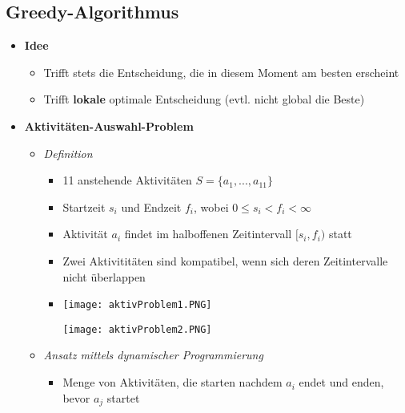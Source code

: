 \subsection{Greedy-Algorithmus}
    \begin{itemize}
        \item \textbf{Idee}
            \begin{itemize}
                \item Trifft stets die Entscheidung, die in diesem Moment am besten erscheint
                \item Trifft \textbf{lokale} optimale Entscheidung (evtl. nicht global die Beste)
            \end{itemize}
        
        \item \textbf{Aktivitäten-Auswahl-Problem}
            \begin{itemize}
                \item \textit{Definition}
                    \begin{itemize}
                        \item 11 anstehende Aktivitäten $S=\{a_1,...,a_{11}\}$
                        \item Startzeit $s_i$ und Endzeit $f_i$, wobei $0 \leq s_i < f_i < \infty$
                        \item Aktivität $a_i$ findet im halboffenen Zeitintervall $[s_i,f_i)$ statt
                        \item Zwei Aktivititäten sind kompatibel, wenn sich deren Zeitintervalle nicht überlappen
                        \item[]
                            \begin{minipage}{0.6\textwidth}
                                \texttt{[image: aktivProblem1.PNG]}
                            \end{minipage}
                            \begin{minipage}{0.3\textwidth}
                                \texttt{[image: aktivProblem2.PNG]}
                            \end{minipage}
                    \end{itemize}
\pagebreak
                \item \textit{Ansatz mittels dynamischer Programmierung}
                    \begin{itemize}
                        \item Menge von Aktivitäten, die starten nachdem $a_i$ endet und enden, bevor $a_j$ startet \\

\end{itemize}
\end{itemize}
\end{itemize}
